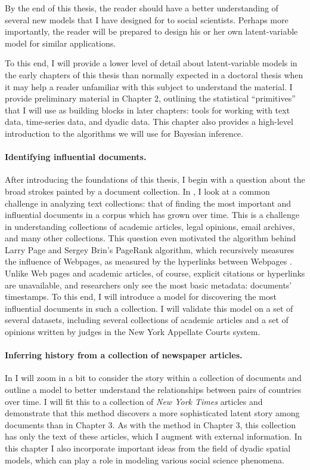By the end of this thesis, the reader should have a better
understanding of several new models that I have designed for to social
scientists.  Perhaps more importantly, the reader will be prepared to
design his or her own latent-variable model for similar applications.

To this end, I will provide a lower level of detail about
latent-variable models in the early chapters of this thesis than
normally expected in a doctoral thesis when it may help a reader
unfamiliar with this subject to understand the material.  I provide
preliminary material in Chapter 2, outlining the statistical
``primitives'' that I will use as building blocks in later chapters:
tools for working with text data, time-series data, and dyadic data.
This chapter also provides a high-level introduction to the algorithms
we will use for Bayesian inference.

\paragraph{Identifying influential documents.} After introducing the
foundations of this thesis, I begin with a question about the broad
strokes painted by a document collection. In , I
look at a common challenge in analyzing text collections: that of
finding the most important and influential documents in a corpus which
has grown over time.  This is a challenge in understanding collections
of academic articles, legal opinions, email archives, and many other
collections. This question even motivated the algorithm behind Larry
Page and Sergey Brin's PageRank algorithm, which recursively measures
the influence of Webpages, as measured by the hyperlinks between
Webpages \citep{garfield:1992,brin:1998,garfield:2002}.  Unlike Web
pages and academic articles, of course, explicit citations or
hyperlinks are unavailable, and researchers only see the most basic
metadata: documents' timestamps.  To this end, I will introduce a
model for discovering the most influential documents in such a
collection. I will validate this model on a set of several datasets,
including several collections of academic articles and a set of
opinions written by judges in the New York Appellate Courts system.

\paragraph{Inferring history from a collection of newspaper articles.}
In  I will zoom in a bit to consider the
story within a collection of documents and outline a model to better
understand the relationships between pairs of countries over time.  I
will fit this to a collection of \emph{New York Times} articles and
demonstrate that this method discovers a more sophisticated latent
story among documents than in Chapter 3.  As with the method in Chapter
3, this collection has only the text of these articles, which I
augment with external information.  In this chapter I also incorporate
important ideas from the field of dyadic spatial models, which can
play a role in modeling various social science phenomena.


